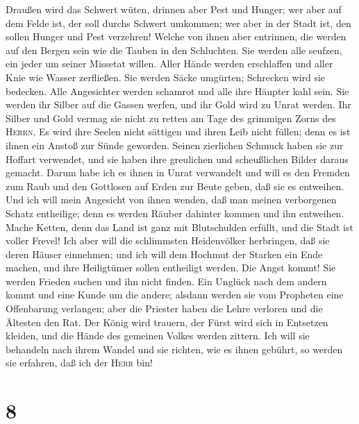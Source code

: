 Draußen wird das Schwert wüten, drinnen aber Pest und Hunger; wer aber
auf dem Felde ist, der soll durchs Schwert umkommen; wer aber in der
Stadt ist, den sollen Hunger und Pest verzehren!  Welche
von ihnen aber entrinnen, die werden auf den Bergen sein wie die Tauben
in den Schluchten. Sie werden alle seufzen, ein jeder um seiner Missetat
willen.  Aller Hände werden erschlaffen und aller Knie
wie Wasser zerfließen.  Sie werden Säcke umgürten;
Schrecken wird sie bedecken. Alle Angesichter werden schamrot und alle
ihre Häupter kahl sein.  Sie werden ihr Silber auf die
Gassen werfen, und ihr Gold wird zu Unrat werden. Ihr Silber und Gold
vermag sie nicht zu retten am Tage des grimmigen Zorns des
\textsc{Herrn}. Es wird ihre Seelen nicht sättigen und ihren Leib nicht
füllen; denn es ist ihnen ein Anstoß zur Sünde geworden. 
Seinen zierlichen Schmuck haben sie zur Hoffart verwendet, und sie haben
ihre greulichen und scheußlichen Bilder daraus gemacht. Darum habe ich
es ihnen in Unrat verwandelt  und will es den Fremden zum
Raub und den Gottlosen auf Erden zur Beute geben, daß sie es entweihen.
 Und ich will mein Angesicht von ihnen wenden, daß man
meinen verborgenen Schatz entheilige; denn es werden Räuber dahinter
kommen und ihn entweihen.  Mache Ketten, denn das Land
ist ganz mit Blutschulden erfüllt, und die Stadt ist voller Frevel!
 Ich aber will die schlimmsten Heidenvölker herbringen,
daß sie deren Häuser einnehmen; und ich will dem Hochmut der Starken ein
Ende machen, und ihre Heiligtümer sollen entheiligt werden.
 Die Angst kommt! Sie werden Frieden suchen und ihn nicht
finden.  Ein Unglück nach dem andern kommt und eine Kunde
um die andere; alsdann werden sie vom Propheten eine Offenbarung
verlangen; aber die Priester haben die Lehre verloren und die Ältesten
den Rat.  Der König wird trauern, der Fürst wird sich in
Entsetzen kleiden, und die Hände des gemeinen Volkes werden zittern. Ich
will sie behandeln nach ihrem Wandel und sie richten, wie es ihnen
gebührt, so werden sie erfahren, daß ich der \textsc{Herr} bin!

\hypertarget{section-7}{%
\section{8}\label{section-7}}

